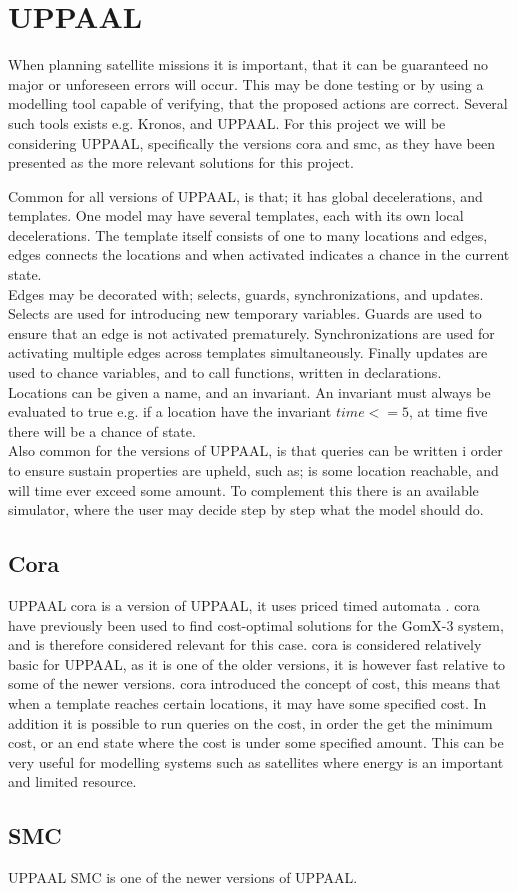 \section{UPPAAL}
When planning satellite missions it is important, that it can be guaranteed no major or unforeseen errors will occur. This may be done testing or by using a modelling tool capable of verifying, that the proposed actions are correct\cite{cs_smc}. Several such tools exists e.g. Kronos, and UPPAAL. For this project we will be considering UPPAAL, specifically the versions \gls{cora} and \gls{smc}, as they have been presented as the more relevant solutions for this project.

Common for all versions of UPPAAL, is that; it has global decelerations, and templates. One model may have several templates, each with its own local decelerations. The template itself consists of one to many locations and edges, edges connects the locations and when activated indicates a chance in the current state.\\
Edges may be decorated with; selects, guards, synchronizations, and updates. Selects are used for introducing new temporary variables. Guards are used to ensure that an edge is not activated prematurely. Synchronizations are used for activating multiple edges across templates simultaneously. Finally updates are used to chance variables, and to call functions, written in declarations.\\
Locations can be given a name, and an invariant. An invariant must always be evaluated to true e.g. if a location have the invariant $time <= 5$, at time five there will be a chance of state.\\
Also common for the versions of UPPAAL, is that queries can be written i order to ensure sustain properties are upheld, such as; is some location reachable, and will time ever exceed some amount. To complement this there is an available simulator, where the user may decide step by step what the model should do.


\subsection{Cora}
UPPAAL \gls{cora} is a version of UPPAAL, it uses priced timed automata \cite{cs_cora}. \Gls{cora} have previously been used to find cost-optimal solutions for the GomX-3 system\cite{gomx3}, and is therefore considered relevant for this case.
\Gls{cora} is considered relatively basic for UPPAAL, as it is one of the older versions, it is however fast relative to some of the newer versions. \Gls{cora} introduced the concept of cost, this means that when a template reaches certain locations, it may have some specified cost. In addition it is possible to run queries on the cost, in order the get the minimum cost, or an end state where the cost is under some specified amount.
This can be very useful for modelling systems such as satellites where energy is an important and limited resource.


\subsection{SMC}
UPPAAL SMC is one of the newer versions of UPPAAL.


